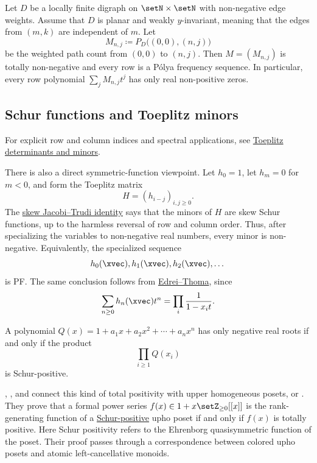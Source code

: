 \begin{theorem}\label{thm:brenti}
Let \(D\) be a locally finite digraph on \(\setN\times\setN\) with
non-negative edge weights.  Assume that \(D\) is planar and weakly
\(y\)-invariant, meaning that the edges from \((m,k)\) are independent
of \(m\).  Let
\[
  M_{n,j}\coloneqq P_D\bigl((0,0),(n,j)\bigr)
\]
be the weighted path count from \((0,0)\) to \((n,j)\).  Then
\(M=(M_{n,j})\) is totally non-negative and every row is a Pólya frequency
sequence.  In particular, every row polynomial \(\sum_j M_{n,j}t^j\)
has only real non-positive zeros.
\end{theorem}

\subsection[pfSchurJacobiTrudi]{Schur functions and Toeplitz minors}

For explicit row and column indices and spectral applications, see
\hyperref[toeplitzSchurMinors]{Toeplitz determinants and minors}.

There is also a direct symmetric-function viewpoint.  Let \(h_0=1\),
let \(h_m=0\) for \(m<0\), and form the Toeplitz matrix
\[
  H=(h_{i-j})_{i,j\geq 0}.
\]
The \hyperref[skewJacobiTrudi]{skew Jacobi--Trudi identity} says that the
minors of \(H\) are skew Schur functions, up to the harmless reversal of row
and column order.  Thus, after specializing the variables to non-negative
real numbers, every minor is non-negative.  Equivalently, the specialized
sequence
\[
  h_0(\xvec), h_1(\xvec), h_2(\xvec),\dotsc
\]
is PF.  The same conclusion follows from
\hyperref[edreiThomaTheorem]{Edrei--Thoma}, since
\[
  \sum_{n\geq 0} h_n(\xvec)t^n = \prod_i \frac{1}{1-x_it}.
\]

\begin{theorem}
\label{stanleySchurPositiveRealRooted}
A polynomial \(Q(x)=1+a_1x+a_2x^2+\dotsb+a_nx^n\) has only negative real
roots if and only if the product
\[
  \prod_{i\geq 1} Q(x_i)
\]
is Schur-positive.
\end{theorem}

, , and  connect this
kind of total positivity with upper homogeneous posets, or
\label{uphoPoset} \cite{FuPengZhang2024x}.  They prove
that a formal power series \(f(x)\in 1+x\setZ_{\geq 0}[[x]]\) is the
rank-generating function of a \hyperref[schurPositivity]{Schur-positive} upho
poset if and only if \(f(x)\) is totally positive.  Here Schur positivity
refers to the Ehrenborg quasisymmetric function of the poset.  Their proof
passes through a correspondence between colored upho posets and atomic
left-cancellative monoids.
